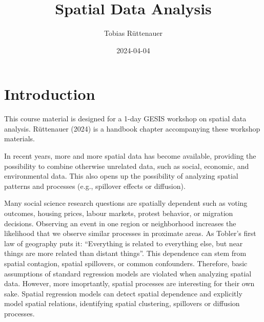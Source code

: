 \documentclass[
  letterpaper,
  DIV=11,
  numbers=noendperiod]{scrreprt}
\title{Spatial Data Analysis}
\author{Tobias Rüttenauer}
\date{2024-04-04}
\renewcommand*\contentsname{Table of contents}
\newcommand\contentsname{Table of contents}
\begin{document}
\maketitle
\ifdefined\Shaded\renewenvironment{Shaded}{\begin{tcolorbox}[sharp corners, frame hidden, enhanced, interior hidden, boxrule=0pt, borderline west={3pt}{0pt}{shadecolor}, breakable]}{\end{tcolorbox}}\fi

\renewcommand*\contentsname{Table of contents}
{
\hypersetup{linkcolor=}
\setcounter{tocdepth}{2}
\tableofcontents
}

\hypertarget{introduction}{%
\chapter*{Introduction}\label{introduction}}


This course material is designed for a 1-day GESIS workshop on spatial
data analysis. Rüttenauer (2024) is a handbook chapter accompanying
these workshop materials.

In recent years, more and more spatial data has become available,
providing the possibility to combine otherwise unrelated data, such as
social, economic, and environmental data. This also opens up the
possibility of analyzing spatial patterns and processes (e.g., spillover
effects or diffusion).

Many social science research questions are spatially dependent such as
voting outcomes, housing prices, labour markets, protest behavior, or
migration decisions. Observing an event in one region or neighborhood
increases the likelihood that we observe similar processes in proximate
areas. As Tobler's first law of geography puts it: ``Everything is
related to everything else, but near things are more related than
distant things''. This dependence can stem from spatial contagion,
spatial spillovers, or common confounders. Therefore, basic assumptions
of standard regression models are violated when analyzing spatial data.
However, more imoprtantly, spatial processes are interesting for their
own sake. Spatial regression models can detect spatial dependence and
explicitly model spatial relations, identifying spatial clustering,
spillovers or diffusion processes.
\end{document}
